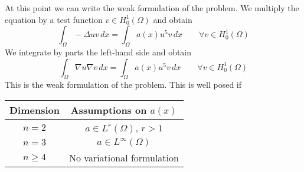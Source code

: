 At this point we can write the weak formulation of the problem. We multiply the
equation by a test function \(v \in H^1_0(\Omega)\) and obtain
\[
    \int_\Omega - \Delta u v \, dx = \int_\Omega a(x) u^5 v \, dx \qquad \forall v \in H^1_0(\Omega)
\]
We integrate by parts the left-hand side and obtain
\[
    \int_\Omega \nabla u \nabla v \, dx = \int_\Omega a(x) u^5 v \, dx \qquad \forall v \in H^1_0(\Omega)
\]
This is the weak formulation of the problem. This is well posed if
\begin{table}[h]
    \centering
    \begin{tabular}{|c|c|}
        \hline
        Dimension  & Assumptions on $a(x)$        \\
        \hline
        $n = 2$    & $a \in L^r(\Omega)$, $r > 1$ \\
        $n = 3$    & $a \in L^\infty(\Omega)$     \\
        $n \geq 4$ & No variational formulation   \\
        \hline
    \end{tabular}
\end{table}

